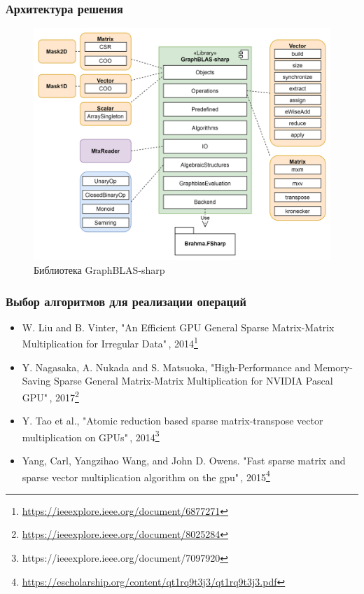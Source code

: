 \documentclass{beamer}
\begin{document}
\begin{frame}  
  \frametitle{Архитектура решения}
  \begin{figure}
    \includegraphics[scale=0.4]{pictures/dia3.png}
    \caption{Библиотека GraphBLAS-sharp}
  \end{figure}
\end{frame} 

\begin{frame}  
  \frametitle{Выбор алгоритмов для реализации операций}
  \begin{itemize}
    \item W. Liu and B. Vinter, "An Efficient GPU General Sparse Matrix-Matrix Multiplication for Irregular Data"\,, 2014\footnote{\url{https://ieeexplore.ieee.org/document/6877271}}
    \item Y. Nagasaka, A. Nukada and S. Matsuoka, "High-Performance and Memory-Saving Sparse General Matrix-Matrix Multiplication for NVIDIA Pascal GPU"\,, 2017\footnote{\url{https://ieeexplore.ieee.org/document/8025284}}
    \item Y. Tao et al., "Atomic reduction based sparse matrix-transpose vector multiplication on GPUs"\,, 2014\footnote{https://ieeexplore.ieee.org/document/7097920}
    \item Yang, Carl, Yangzihao Wang, and John D. Owens. "Fast sparse matrix and sparse vector multiplication algorithm on the gpu"\,, 2015\footnote{\url{https://escholarship.org/content/qt1rq9t3j3/qt1rq9t3j3.pdf}}
  \end{itemize}
\end{frame} 
\end{document}
